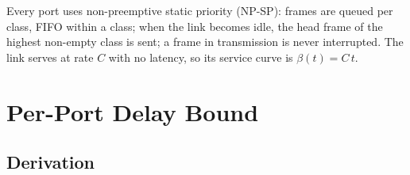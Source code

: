\documentclass[9pt,a4paper,twocolumn,twoside]{tau-class/tau}
\begin{document}
        Every port uses non-preemptive static priority (NP-SP): frames are queued per class, FIFO within a class; when the link becomes idle, the head frame of the highest non-empty class is sent; a frame in transmission is never interrupted. The link serves at rate $C$ with no latency, so its service curve is $\beta(t) = C\,t$.


\section{Per-Port Delay Bound}
\label{sec:port}

    \subsection{Derivation}
\end{document}
